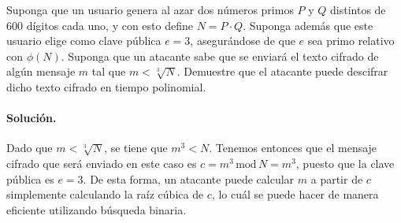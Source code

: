Suponga que un usuario genera al azar dos números primos $P$ y $Q$ distintos de 600 dígitos cada uno, y con esto define $N = P \cdot Q$. Suponga además que este usuario elige como clave pública $e = 3$, asegurándose de que $e$ sea primo relativo con $\phi(N)$. Suponga que un atacante sabe que se enviará el texto cifrado de algún mensaje $m$ tal que $m < \sqrt[3]{N}$. Demuestre que el atacante puede descifrar dicho texto cifrado en tiempo polinomial.

\paragraph{Solución.} Dado que $m < \sqrt[3]{N}$, se tiene que $m^3 < N$. Tenemos entonces que el mensaje cifrado que será enviado en este caso es $c = m^3 \,\text{mod}\, N = m^3$, puesto que la clave pública es $e = 3$. De esta forma, un atacante puede calcular $m$ a partir de $c$ simplemente calculando la raíz cúbica de $c$, lo cuál se puede hacer de manera eficiente utilizando búsqueda binaria.
